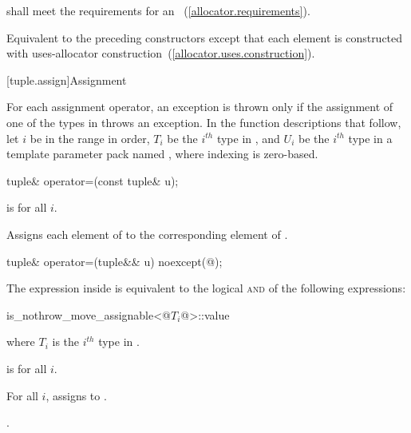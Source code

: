 \begin{itemdescr}
\pnum
\requires {} shall meet the requirements for an
~(\ref{allocator.requirements}).

\pnum
\effects Equivalent to the preceding constructors except that each element is constructed with
uses-allocator construction~(\ref{allocator.uses.construction}).
\end{itemdescr}

[tuple.assign]{Assignment}

\pnum
For each  assignment operator, an exception is thrown only if the
assignment of one of the types in  throws an exception.
In the function descriptions that follow, let $i$ be in the range 
in order, $T_i$ be the $i^{th}$ type in , and $U_i$ be the $i^{th}$ type in a
template parameter pack named , where indexing is zero-based.

%
%
\begin{itemdecl}
tuple& operator=(const tuple& u);
\end{itemdecl}

\begin{itemdescr}
\pnum
\requires {} is  for all $i$.

\pnum
\effects  Assigns each element of  to the corresponding
element of .

\pnum
\returns  {}
\end{itemdescr}

%
%
\begin{itemdecl}
tuple& operator=(tuple&& u) noexcept(@\seebelow@);
\end{itemdecl}

\begin{itemdescr}
\pnum
\remark The expression inside  is equivalent to the logical \textsc{and} of the
following expressions:

\begin{codeblock}
is_nothrow_move_assignable<@$T_i$@>::value
\end{codeblock}

where $T_i$ is the $i^{th}$ type in .

\pnum
\requires {} is  for all $i$.

\pnum
\effects For all $i$, assigns  to
.

\pnum
\returns {}.
\end{itemdescr}

